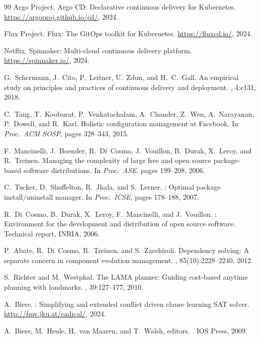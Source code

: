 \documentclass[10pt,twocolumn]{article}
\begin{document}
\begin{thebibliography}{99}
{Argo Project}.
\newblock Argo {CD}: Declarative continuous delivery for {K}ubernetes.
\newblock \url{https://argoproj.github.io/cd/}, 2024.

{Flux Project}.
\newblock Flux: The {G}it{O}ps toolkit for {K}ubernetes.
\newblock \url{https://fluxcd.io/}, 2024.

{Netflix}.
\newblock Spinnaker: Multi-cloud continuous delivery platform.
\newblock \url{https://spinnaker.io/}, 2024.

G.~Schermann, J.~Cito, P.~Leitner, U.~Zdun, and H.~C.~Gall.
\newblock An empirical study on principles and practices of continuous delivery and deployment.
, 4:e131, 2018.

C.~Tang, T.~Kooburat, P.~Venkatachalam, A.~Chander, Z.~Wen, A.~Narayanan, P.~Dowell, and R.~Karl.
\newblock Holistic configuration management at {F}acebook.
\newblock In {\em Proc.\ ACM SOSP}, pages 328--343, 2015.

F.~Mancinelli, J.~Boender, R.~Di~Cosmo, J.~Vouillon, B.~Durak, X.~Leroy, and R.~Treinen.
\newblock Managing the complexity of large free and open source package-based software distributions.
\newblock In {\em Proc.\ ASE}, pages 199--208, 2006.

C.~Tucker, D.~Shuffelton, R.~Jhala, and S.~Lerner.
: Optimal package install/uninstall manager.
\newblock In {\em Proc.\ ICSE}, pages 178--188, 2007.

R.~Di~Cosmo, B.~Durak, X.~Leroy, F.~Mancinelli, and J.~Vouillon.
: Environment for the development and distribution of open source software.
\newblock Technical report, INRIA, 2006.

P.~Abate, R.~Di~Cosmo, R.~Treinen, and S.~Zacchiroli.
\newblock Dependency solving: A separate concern in component evolution management.
, 85(10):2228--2240, 2012.

S.~Richter and M.~Westphal.
\newblock The {LAMA} planner: Guiding cost-based anytime planning with landmarks.
, 39:127--177, 2010.

A.~Biere.
: Simplifying and extended conflict driven clause learning {SAT} solver.
\newblock \url{http://fmv.jku.at/cadical/}, 2024.

A.~Biere, M.~Heule, H.~van Maaren, and T.~Walsh, editors.
.
\newblock IOS Press, 2009.

\end{thebibliography}
\end{document}
